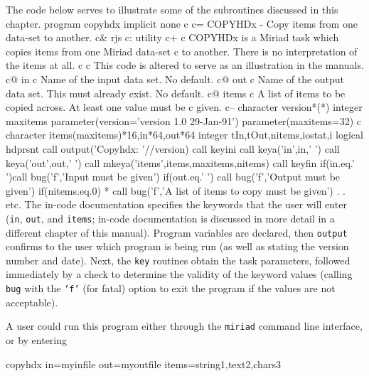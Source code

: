 The code below serves to illustrate some of the subroutines discussed in
this chapter.
{\ninepoint\begintt
        program copyhdx
        implicit none
c
c= COPYHDx - Copy items from one data-set to another.
c& rjs
c: utility
c+
c       COPYHDx is a Miriad task which copies items from one Miriad data-set
c       to another. There is no interpretation of the items at all.
c
c       This code is altered to serve as an illustration in the manuals.
c@ in
c       Name of the input data set. No default.
c@ out
c       Name of the output data set. This must already exist. No default.
c@ items
c       A list of items to be copied across. At least one value must be
c       given.
c--
\endtt}
{\ninepoint\begintt
        character version*(*)
        integer maxitems
        parameter(version='version 1.0 29-Jan-91')
        parameter(maxitems=32)
c
        character items(maxitems)*16,in*64,out*64
        integer tIn,tOut,nitems,iostat,i
        logical hdprsnt
\endtt}
{\ninepoint\begintt
        call output('Copyhdx: '//version)
        call keyini
        call keya('in',in,' ')
        call keya('out',out,' ')
        call mkeya('items',items,maxitems,nitems)
        call keyfin
\endtt}
{\ninepoint\begintt
        if(in.eq.' ')call bug('f','Input must be given')
        if(out.eq.' ') call bug('f','Output must be given')
        if(nitems.eq.0)
     *    call bug('f','A list of items to copy must be given')
.
.
etc.
\endtt}
The in-code documentation specifies the keywords that the user will enter
({\tt in}, {\tt out}, and {\tt items}; in-code documentation is discussed
in more detail in a different chapter of this manual).  Program variables
are declared, then {\tt output} confirms to the user which program is
being run (as well as stating the version number and date).  Next, the
{\tt key} routines obtain the task parameters, followed immediately by
a check to determine the validity of the keyword values (calling {\tt bug}
with the {\tt 'f'} (for fatal) option to exit the program if the values
are not acceptable).

A user could run this program either through the {\tt miriad} command
line interface, or by entering

{\ninepoint\begintt
copyhdx in=myinfile out=myoutfile items=string1,text2,chars3
\endtt}
